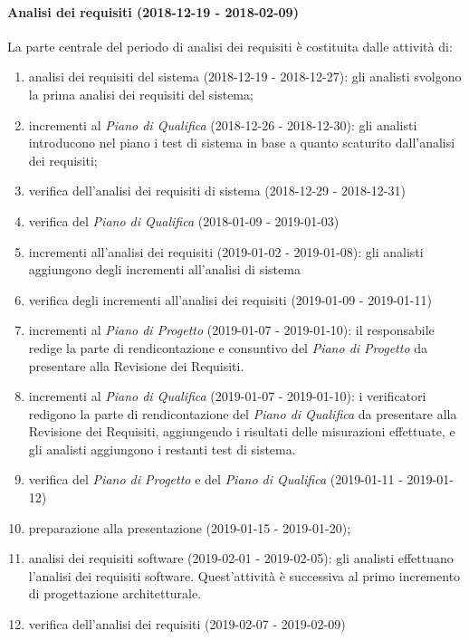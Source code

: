 		\paragraph{Analisi dei requisiti (2018-12-19 - 2018-02-09)\\} La parte centrale del periodo di analisi dei requisiti è costituita dalle attività di:
			\begin{enumerate}[label = 2.2.\arabic*)]
				\item analisi dei requisiti del sistema (2018-12-19 - 2018-12-27): gli analisti svolgono la prima analisi dei requisiti del sistema;
				\item incrementi al \textit{Piano di Qualifica} (2018-12-26 - 2018-12-30): gli analisti introducono nel piano i test di sistema in base a quanto scaturito dall'analisi dei requisiti;
				\item verifica dell'analisi dei requisiti di sistema (2018-12-29 - 2018-12-31)
				\item verifica del \textit{Piano di Qualifica} (2018-01-09 - 2019-01-03)
				\item incrementi all'analisi dei requisiti (2019-01-02 - 2019-01-08): gli analisti aggiungono degli incrementi all'analisi di sistema
				\item verifica degli incrementi all'analisi dei requisiti (2019-01-09 - 2019-01-11)
				\item incrementi al \textit{Piano di Progetto} (2019-01-07 - 2019-01-10): il responsabile redige la parte di rendicontazione e consuntivo del \textit{Piano di Progetto} da presentare alla Revisione dei Requisiti.
				\item incrementi al \textit{Piano di Qualifica} (2019-01-07 - 2019-01-10): i verificatori redigono la parte di rendicontazione del \textit{Piano di Qualifica} da presentare alla Revisione dei Requisiti, aggiungendo i risultati delle misurazioni effettuate, e gli analisti aggiungono i restanti test di sistema.
				\item verifica del \textit{Piano di Progetto} e del \textit{Piano di Qualifica} (2019-01-11 - 2019-01-12)
				\item preparazione alla presentazione (2019-01-15 - 2019-01-20);
				\item analisi dei requisiti software (2019-02-01 - 2019-02-05): gli analisti effettuano l'analisi dei requisiti software. Quest'attività è successiva al primo incremento di progettazione architetturale.
				\item verifica dell'analisi dei requisiti (2019-02-07 - 2019-02-09)				
			\end{enumerate}

